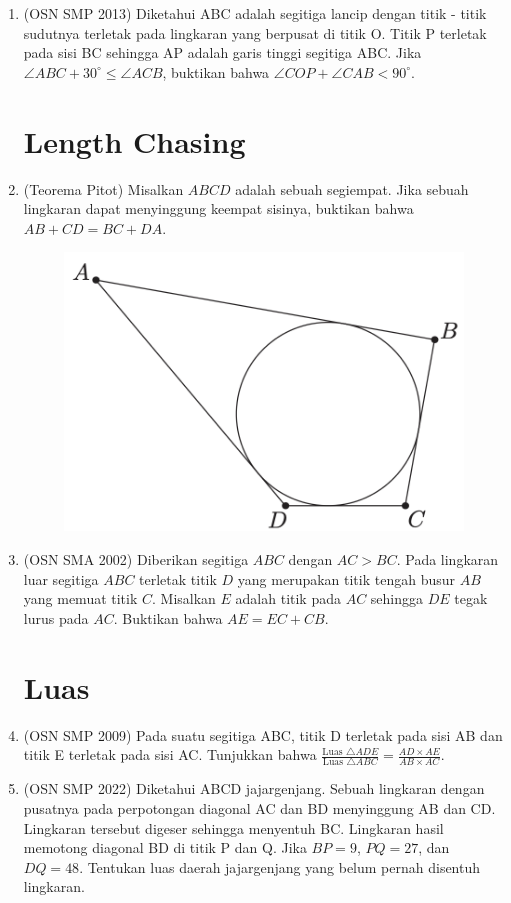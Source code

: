 \documentclass[a4paper, 12pt]{article}
\begin{document}
\begin{enumerate}
    \item (OSN SMP 2013) Diketahui ABC adalah segitiga lancip dengan titik - titik sudutnya terletak pada lingkaran yang berpusat di titik O. Titik P terletak pada sisi BC sehingga AP adalah garis tinggi segitiga ABC. Jika $\angle ABC+30^{\circ} \le \angle ACB$, buktikan bahwa $\angle COP+\angle CAB < 90^{\circ}$.
        
\section{Length Chasing}
    \item (Teorema Pitot) Misalkan $ABCD$ adalah sebuah segiempat. Jika sebuah lingkaran dapat menyinggung keempat sisinya, buktikan bahwa $AB + CD = BC + DA$.
    \begin{figure}[H]
        \includegraphics[width=0.4\linewidth]{0Figure/pitot-theorem.png}
    \end{figure}

            \item (OSN SMA 2002)
    Diberikan segitiga $ABC$ dengan $AC > BC$. Pada lingkaran luar segitiga $ABC$ terletak titik $D$ yang merupakan titik tengah busur $AB$ yang memuat titik $C$. Misalkan $E$ adalah titik pada $AC$ sehingga $DE$ tegak lurus pada $AC$. Buktikan bahwa $AE = EC + CB$.

\section{Luas}
    \item (OSN SMP 2009) Pada suatu segitiga ABC, titik D terletak pada sisi AB dan titik E terletak pada sisi AC. Tunjukkan bahwa $\frac{\text{Luas } \triangle ADE}{\text{Luas } \triangle ABC} = \frac{AD \times AE}{AB \times AC}$.

    \item (OSN SMP 2022) Diketahui ABCD jajargenjang. Sebuah lingkaran dengan pusatnya pada perpotongan diagonal AC dan BD menyinggung AB dan CD. Lingkaran tersebut digeser sehingga menyentuh BC. Lingkaran hasil memotong diagonal BD di titik P dan Q. Jika $BP=9$, $PQ=27$, dan $DQ=48$. Tentukan luas daerah jajargenjang yang belum pernah disentuh lingkaran.


\end{enumerate}
\end{document}
